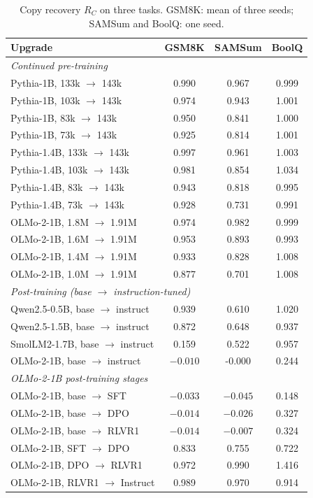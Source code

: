\documentclass[ijds,nonblindrev]{informs4}
\begin{document}
\begin{table}[t]
\centering
\caption{Copy recovery $R_C$ on three tasks. GSM8K: mean of three seeds; SAMSum and BoolQ: one seed.}\label{tab:tasks}
\small
\begin{tabular}{lccc}
\toprule
Upgrade & GSM8K & SAMSum & BoolQ\\
\midrule
\multicolumn{4}{l}{\emph{Continued pre-training}}\\
Pythia-1B, 133k $\to$ 143k & 0.990 & 0.967 & 0.999\\
Pythia-1B, 103k $\to$ 143k & 0.974 & 0.943 & 1.001\\
Pythia-1B, 83k $\to$ 143k & 0.950 & 0.841 & 1.000\\
Pythia-1B, 73k $\to$ 143k & 0.925 & 0.814 & 1.001\\
Pythia-1.4B, 133k $\to$ 143k & 0.997 & 0.961 & 1.003\\
Pythia-1.4B, 103k $\to$ 143k & 0.981 & 0.854 & 1.034\\
Pythia-1.4B, 83k $\to$ 143k & 0.943 & 0.818 & 0.995\\
Pythia-1.4B, 73k $\to$ 143k & 0.928 & 0.731 & 0.991\\
OLMo-2-1B, 1.8M $\to$ 1.91M & 0.974 & 0.982 & 0.999\\
OLMo-2-1B, 1.6M $\to$ 1.91M & 0.953 & 0.893 & 0.993\\
OLMo-2-1B, 1.4M $\to$ 1.91M & 0.933 & 0.828 & 1.008\\
OLMo-2-1B, 1.0M $\to$ 1.91M & 0.877 & 0.701 & 1.008\\
\multicolumn{4}{l}{\emph{Post-training (base $\to$ instruction-tuned)}}\\
Qwen2.5-0.5B, base $\to$ instruct & 0.939 & 0.610 & 1.020\\
Qwen2.5-1.5B, base $\to$ instruct & 0.872 & 0.648 & 0.937\\
SmolLM2-1.7B, base $\to$ instruct & 0.159 & 0.522 & 0.957\\
OLMo-2-1B, base $\to$ instruct & $-0.010$ & -0.000 & 0.244\\
\multicolumn{4}{l}{\emph{OLMo-2-1B post-training stages}}\\
OLMo-2-1B, base $\to$ SFT & $-0.033$ & $-0.045$ & 0.148\\
OLMo-2-1B, base $\to$ DPO & $-0.014$ & $-0.026$ & 0.327\\
OLMo-2-1B, base $\to$ RLVR1 & $-0.014$ & $-0.007$ & 0.324\\
OLMo-2-1B, SFT $\to$ DPO & 0.833 & 0.755 & 0.722\\
OLMo-2-1B, DPO $\to$ RLVR1 & 0.972 & 0.990 & 1.416\\
OLMo-2-1B, RLVR1 $\to$ Instruct & 0.989 & 0.970 & 0.914\\
\bottomrule
\end{tabular}
\end{table}
\end{document}
